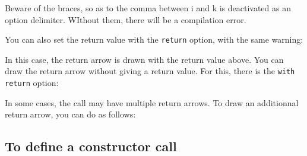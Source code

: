 \documentclass[a4paper,11pt]{report}
\begin{document}
\medskip

\begin{remark}
	Beware of the braces, so as to the comma between i and k is deactivated as an option delimiter. WIthout them, there will be a compilation error.
\end{remark}

\medskip

You can also set the return value with the {\tt return} option, with the same warning:

\medskip

\begin{minipage}{0.5\textwidth}
	
\end{minipage}
\begin{minipage}{0.5\textwidth}
	\begin{center}
	\end{center}
\end{minipage}

\medskip

In this case, the return arrow is drawn with the return value above. You can draw the return arrow without giving a return value. For this, there is the {\tt with return} option:

\medskip

\begin{minipage}{0.5\textwidth}
	
\end{minipage}
\begin{minipage}{0.5\textwidth}
	\begin{center}
	\end{center}
\end{minipage}

\medskip

In some cases, the call may have multiple return arrows. To draw an additionnal return arrow, you can do as follows:

\medskip

\begin{minipage}{0.5\textwidth}
	
\end{minipage}
\begin{minipage}{0.5\textwidth}
	\begin{center}
	\end{center}
\end{minipage}

\subsection{To define a constructor call}\label{ss.create}
\end{document}
